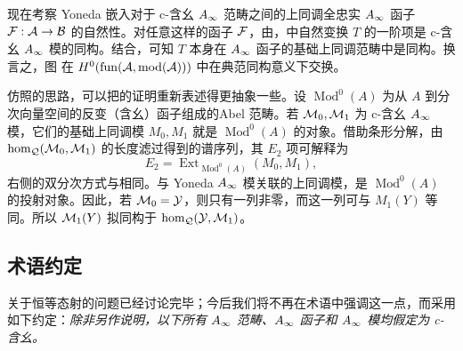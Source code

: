 现在考察 Yoneda 嵌入对于 c-含幺 $A_\infty$ 范畴之间的上同调全忠实 $A_\infty$ 函子 $\mathcal F:\mathcal A\to\mathcal B$ 的自然性。对任意这样的函子 $\mathcal F$，由，中自然变换 $T$ 的一阶项是 c-含幺 $A_\infty$ 模的同构。结合，可知 $T$ 本身在 $A_\infty$ 函子的基础上同调范畴中是同构。换言之，图
在 $H^0(\operatorname{fun}(\mathcal A,\operatorname{mod}(\mathcal A)))$ 中在典范同构意义下交换。

\begin{note}\label{st:2.15}
仿照的思路，可以把的证明重新表述得更抽象一些。设 $\operatorname{Mod}^0(A)$ 为从 $A$ 到分次向量空间的反变（含幺）函子组成的Abel 范畴。若 $\mathcal M_0,\mathcal M_1$ 为 c-含幺 $A_\infty$ 模，它们的基础上同调模 $M_0,M_1$ 就是 $\operatorname{Mod}^0(A)$ 的对象。借助条形分解，由 $\hom_{\mathcal Q}(\mathcal M_0,\mathcal M_1)$ 的长度滤过得到的谱序列，其 $E_2$ 项可解释为
\begin{equation}\label{eq:2.14}
E_2=\operatorname{Ext}_{\operatorname{Mod}^0(A)}(M_0,M_1),
\end{equation}
右侧的双分次方式与相同。与 Yoneda $A_\infty$ 模关联的上同调模，是 $\operatorname{Mod}^0(A)$ 的投射对象。因此，若 $\mathcal M_0=\mathcal Y$，则只有一列非零，而这一列可与 $M_1(Y)$ 等同。所以 $\mathcal M_1(Y)$ 拟同构于 $\hom_{\mathcal Q}(\mathcal Y,\mathcal M_1)$。
\end{note}

\subsection{术语约定}\label{sec:2h}
关于恒等态射的问题已经讨论完毕；今后我们将不再在术语中强调这一点，而采用如下约定：\emph{除非另作说明，以下所有 $A_\infty$ 范畴、$A_\infty$ 函子和 $A_\infty$ 模均假定为 c-含幺。}
